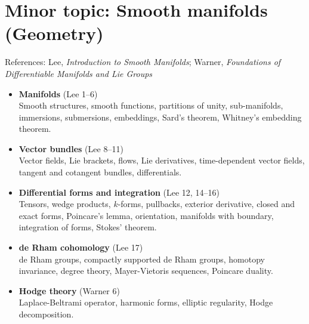 \documentclass[11pt]{article}
\begin{document}
\section{Minor topic: Smooth manifolds (Geometry)}

References: Lee, \textit{Introduction to Smooth Manifolds}; Warner, \textit{Foundations of Differentiable Manifolds and Lie Groups}
\begin{itemize}
\item \textbf{Manifolds} (Lee 1--6) \\
Smooth structures, smooth functions, partitions of unity, sub-manifolds, immersions, submersions, embeddings, Sard's theorem, Whitney's embedding theorem. 

\item \textbf{Vector bundles} (Lee 8--11) \\
Vector fields, Lie brackets, flows, Lie derivatives, time-dependent vector fields, tangent and cotangent bundles, differentials. 

\item \textbf{Differential forms and integration} (Lee 12, 14--16)\\
Tensors, wedge products, $k$-forms, pullbacks, exterior derivative, closed and exact forms, Poincare's lemma, orientation, manifolds with boundary, integration of forms, Stokes' theorem.

\item \textbf{de Rham cohomology} (Lee 17) \\
de Rham groups, compactly supported de Rham groups, homotopy invariance, degree theory, Mayer-Vietoris sequences, Poincare duality.

\item \textbf{Hodge theory} (Warner 6) \\
Laplace-Beltrami operator, harmonic forms, elliptic regularity, Hodge decomposition.
\end{itemize}
\end{document}
